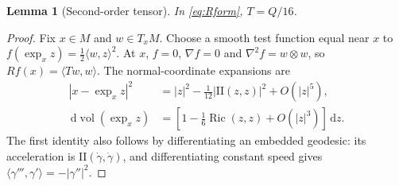 \documentclass[11pt,a4paper]{article}
\newtheorem{lemma}[theorem]{Lemma}
\theoremstyle{definition}\newtheorem{definition}[theorem]{Definition}
\theoremstyle{remark}\newtheorem{remark}[theorem]{Remark}
\newcommand{\dd}{\,\mathrm d}
\newcommand{\II}{\mathrm{II}}
\newcommand{\Ric}{\operatorname{Ric}}
\begin{document}
\begin{lemma}[Second-order tensor]\label{lem:shape}
In \eqref{eq:Rform}, $T=Q/16$.
\end{lemma}
\begin{proof}
Fix $x\in M$ and $w\in T_xM$. Choose a smooth test function equal near $x$ to
$f(\exp_x z)=\tfrac12\langle w,z\rangle^2$.
At $x$, $f=0$, $\nabla f=0$ and $\nabla^2f=w\otimes w$, so $Rf(x)=\langle Tw,w\rangle$.
The normal-coordinate expansions are
\begin{align}
|x-\exp_xz|^2&=|z|^2-\tfrac1{12}|\II(z,z)|^2+O(|z|^5),\label{eq:chord}\\
\dd\operatorname{vol}(\exp_xz)&=\left[1-\tfrac16\Ric(z,z)+O(|z|^3)\right]\dd z.\label{eq:vol}
\end{align}
The first identity also follows by differentiating an embedded geodesic: its acceleration is $\II(\dot\gamma,\dot\gamma)$, and differentiating constant speed gives
$\langle\gamma''',\gamma'\rangle=-|\gamma''|^2$.


\end{proof}
\end{document}
